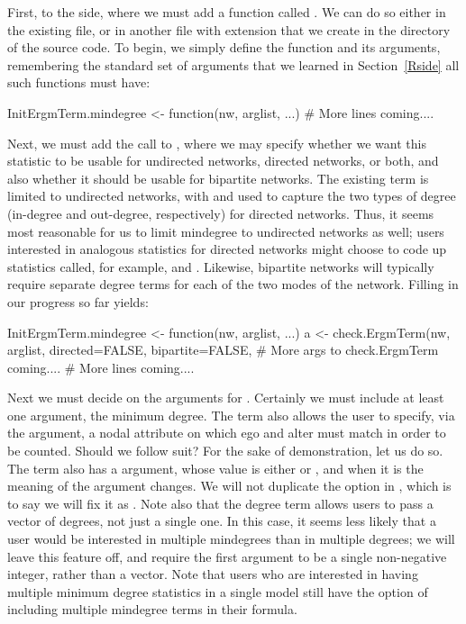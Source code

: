 \documentclass[nojss]{jss}
\begin{document}
First, to the  side, where we must add a function called .  We can do so either in the existing  file, or in another file with extension  that we create in the  directory of the  source code. To begin, we simply define the function and its arguments, remembering the standard set of arguments that we learned in Section~\ref{Rside} all such functions must have:
\begin{CodeChunk}
\begin{CodeInput}
InitErgmTerm.mindegree <- function(nw, arglist, ...) {
  # More lines coming....
}
\end{CodeInput}
\end{CodeChunk}

Next, we must add the call to , where we may specify
whether we want this statistic to be usable for undirected networks,
directed networks, or both, and also whether it should be usable for bipartite networks.
The existing  term  is limited to undirected networks, with  and  used to capture the two types of degree (in-degree and out-degree, respectively) for directed networks. Thus, it seems most reasonable for us to limit mindegree to undirected networks as well; users interested in analogous statistics for directed networks might choose to code up statistics called, for example,  and . Likewise, bipartite networks will typically require separate degree terms for each of the two modes of the network.
Filling in our progress so far yields:
\begin{CodeChunk}
\begin{CodeInput}
InitErgmTerm.mindegree <- function(nw, arglist, ...) {
  a <- check.ErgmTerm(nw, arglist, directed=FALSE, bipartite=FALSE,
    # More args to check.ErgmTerm coming....
  # More lines coming....
}
\end{CodeInput}
\end{CodeChunk}
Next we must decide on the arguments for .  Certainly we must include at least one argument, the minimum degree.  The  term also allows the user to specify, via the  argument, a nodal attribute on which ego and alter must match in order to be counted. Should we follow suit? For the sake of demonstration, let us do so.  The  term also has a 
argument, whose value is either  or , and when it is
 the meaning of the  argument changes.  We will not
duplicate the  option in ,
which is to say we will fix it as .
Note also that the degree term allows users to pass a vector of degrees, not just a single one.  In this case, it seems less likely that a user would be interested in multiple mindegrees than in multiple degrees; we will leave this feature off, and require the first argument to be a single non-negative integer, rather than a vector.  Note that users who are interested in having multiple minimum degree statistics in a single model still have the option of including multiple mindegree terms in their formula.
\end{document}
